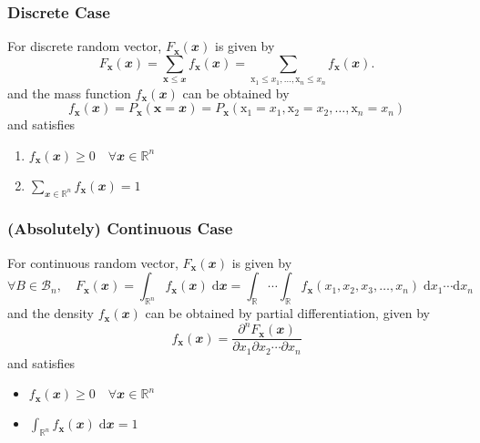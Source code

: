 \documentclass[twoside]{article}
\theoremstyle{definition}
\theoremstyle{remark}
\theoremstyle{remark}
\begin{document}
\subsubsection{Discrete Case}
For discrete random vector, $F_\mathbf{x}(\mathbfit{x})$ is given by
\begin{equation}
  F_\mathbf{x}(\mathbfit{x})
  = \sum_{\mathbf{x} \leq \mathbfit{x}} f_\mathbf{x}(\mathbfit{x})
  = \sum_{\mathrm{x}_1 \leq x_1, \ldots, \mathrm{x}_n \leq x_n} f_\mathbf{x}(\mathbfit{x}).
\end{equation}
and the mass function $f_\mathbf{x}(\mathbfit{x})$ can be obtained by
\begin{equation}
  f_\mathbf{x}(\mathbfit{x})
  = P_\mathbf{x}(\mathbf{x} = \mathbfit{x})
  = P_\mathbf{x}(\mathrm{x}_1 = x_1, \mathrm{x}_2 = x_2, \ldots, \mathrm{x}_n = x_n)
\end{equation}
and satisfies
\begin{enumerate}
  \item $f_\mathbf{x}(\mathbfit{x}) \geq 0 \quad \forall \mathbfit{x} \in \mathbb{R}^n$
  \item $\sum_{\mathbfit{x} \in \mathbb{R}^n} f_\mathbf{x}(\mathbfit{x}) = 1$
\end{enumerate}

\subsubsection{(Absolutely) Continuous Case}
For continuous random vector, $F_\mathbf{x}(\mathbfit{x})$ is given by
\begin{equation}
  \forall B \in \mathcal{B}_n, \quad
  F_\mathbf{x}(\mathbfit{x})
  = \int_{\mathbb{R}^n} f_\mathbf{x}(\mathbfit{x}) \;\mathrm{d}\mathbfit{x}
  = \int_{\mathbb{R}}\cdots\int_{\mathbb{R}} f_\mathbf{x}(x_1, x_2, x_3, \ldots, x_n) \;\mathrm{d}x_1 \cdots  \mathrm{d}x_n
\end{equation}
and the density $f_\mathbf{x}(\mathbfit{x})$ can be obtained by partial
differentiation, given by
\begin{equation}
  f_\mathbf{x}(\mathbfit{x}) = \frac{\partial^n F_\mathbf{x}(\mathbfit{x})}{\partial x_1 \partial x_2 \cdots \partial x_n}
\end{equation}
and satisfies
\begin{itemize}
  \item $f_\mathbf{x}(\mathbfit{x}) \geq 0 \quad \forall \mathbfit{x} \in \mathbb{R}^n$
  \item $\int_{\mathbb{R}^n} f_\mathbf{x}(\mathbfit{x}) \;\mathrm{d}\mathbfit{x} = 1$
\end{itemize}
\end{document}
